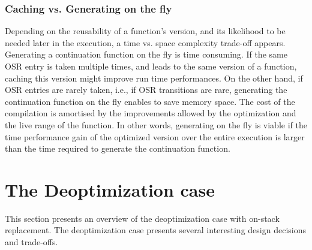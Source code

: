 \subsubsection{Caching vs. Generating on the fly}

Depending on the reusability of a function's version, and its likelihood to be needed later in the execution, a time vs. space complexity trade-off appears.
Generating a continuation function on the fly is time consuming.
If the same OSR entry is taken multiple times, and leads to the same version of a function, caching this version might improve run time performances.
On the other hand, if OSR entries are rarely taken, i.e., if OSR transitions are rare, generating the continuation function on the fly enables to save memory space. 
The cost of the compilation is amortised by the improvements allowed by the optimization and the live range of the function. 
In other words, generating on the fly is viable if the time performance gain of the optimized version over the entire execution is larger than the time required to generate the continuation function.\\


\section{The Deoptimization case}
This section presents an overview of the deoptimization case with on-stack replacement.
The deoptimization case presents several interesting design decisions and trade-offs.

